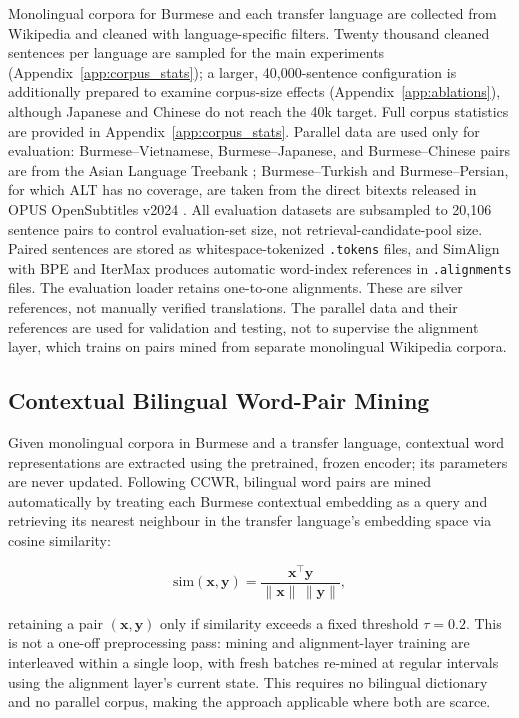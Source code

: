 \documentclass[11pt]{article}
\begin{document}
Monolingual corpora for Burmese and each transfer language are collected from Wikipedia and cleaned with language-specific filters. Twenty thousand cleaned sentences per language are sampled for the main experiments (Appendix~\ref{app:corpus_stats}); a larger, 40,000-sentence configuration is additionally prepared to examine corpus-size effects (Appendix~\ref{app:ablations}), although Japanese and Chinese do not reach the 40k target. Full corpus statistics are provided in Appendix~\ref{app:corpus_stats}. Parallel data are used only for evaluation: Burmese--Vietnamese, Burmese--Japanese, and Burmese--Chinese pairs are from the Asian Language Treebank \citep[ALT;][]{thu-etal-2016-introducing}; Burmese--Turkish and Burmese--Persian, for which ALT has no coverage, are taken from the direct bitexts released in OPUS OpenSubtitles v2024 \citep{lison-tiedemann-2016-opensubtitles}. All evaluation datasets are subsampled to 20,106 sentence pairs to control evaluation-set size, not retrieval-candidate-pool size. Paired sentences are stored as whitespace-tokenized \texttt{.tokens} files, and SimAlign \citep{jalili-sabet-etal-2020-simalign} with BPE and IterMax produces automatic word-index references in \texttt{.alignments} files. The evaluation loader retains one-to-one alignments. These are silver references, not manually verified translations. The parallel data and their references are used for validation and testing, not to supervise the alignment layer, which trains on pairs mined from separate monolingual Wikipedia corpora.

\subsection{Contextual Bilingual Word-Pair Mining}
\label{sec:mining}

Given monolingual corpora in Burmese and a transfer language, contextual word representations are extracted using the pretrained, frozen encoder; its parameters are never updated. Following CCWR, bilingual word pairs are mined automatically by treating each Burmese contextual embedding as a query and retrieving its nearest neighbour in the transfer language's embedding space via cosine similarity:

\begin{equation}
\mathrm{sim}(\mathbf{x}, \mathbf{y}) = \frac{\mathbf{x}^{\top}\mathbf{y}}{\lVert \mathbf{x}\rVert \, \lVert \mathbf{y}\rVert},
\label{eq:cosine}
\end{equation}

retaining a pair $(\mathbf{x}, \mathbf{y})$ only if similarity exceeds a fixed threshold $\tau = 0.2$. This is not a one-off preprocessing pass: mining and alignment-layer training are interleaved within a single loop, with fresh batches re-mined at regular intervals using the alignment layer's current state. This requires no bilingual dictionary and no parallel corpus, making the approach applicable where both are scarce.
\end{document}
